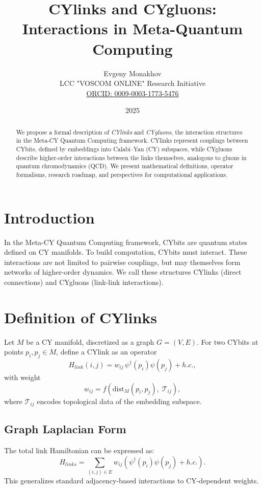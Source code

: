 \documentclass[12pt,a4paper]{article}
\title{CYlinks and CYgluons: Interactions in Meta-Quantum Computing}
\author{Evgeny Monakhov \\ LCC "VOSCOM ONLINE" Research Initiative \\ 
\href{https://orcid.org/0009-0003-1773-5476}{ORCID: 0009-0003-1773-5476}}
\date{2025}
\begin{document}
\maketitle

\begin{abstract}
We propose a formal description of \emph{CYlinks} and \emph{CYgluons}, 
the interaction structures in the Meta-CY Quantum Computing framework.  
CYlinks represent couplings between CYbits, defined by embeddings into 
Calabi--Yau (CY) subspaces, while CYgluons describe higher-order 
interactions between the links themselves, analogous to gluons in quantum chromodynamics (QCD).  
We present mathematical definitions, operator formalisms, 
research roadmap, and perspectives for computational applications.  
\end{abstract}

\section{Introduction}
In the Meta-CY Quantum Computing framework, CYbits are quantum states defined on CY manifolds.  
To build computation, CYbits must interact.  
These interactions are not limited to pairwise couplings, but may themselves form 
networks of higher-order dynamics.  
We call these structures CYlinks (direct connections) and CYgluons (link-link interactions).  

\section{Definition of CYlinks}
Let $M$ be a CY manifold, discretized as a graph $G=(V,E)$.  
For two CYbits at points $p_i,p_j \in M$, define a CYlink as an operator
\begin{equation}
H_{link}(i,j) = w_{ij} \, \psi^\dagger(p_i)\psi(p_j) + h.c.,
\end{equation}
with weight
\begin{equation}
w_{ij} = f(\mathrm{dist}_M(p_i,p_j), \;\mathcal{T}_{ij}),
\end{equation}
where $\mathcal{T}_{ij}$ encodes topological data of the embedding subspace.

\subsection{Graph Laplacian Form}
The total link Hamiltonian can be expressed as:
\begin{equation}
H_{links} = \sum_{(i,j)\in E} w_{ij} ( \psi^\dagger(p_i)\psi(p_j) + h.c. ).
\end{equation}
This generalizes standard adjacency-based interactions to CY-dependent weights.
\end{document}
